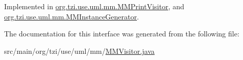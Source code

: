 Implemented in \hyperlink{classorg_1_1tzi_1_1use_1_1uml_1_1mm_1_1_m_m_print_visitor_a9b76c4e1037176dbedbced970a4332a2}{org.\-tzi.\-use.\-uml.\-mm.\-M\-M\-Print\-Visitor}, and \hyperlink{classorg_1_1tzi_1_1use_1_1uml_1_1mm_1_1_m_m_instance_generator_a4f4eb1eb6d803d5123d4d0cc0a38195d}{org.\-tzi.\-use.\-uml.\-mm.\-M\-M\-Instance\-Generator}.



The documentation for this interface was generated from the following file\-:\begin{DoxyCompactItemize}
\item 
src/main/org/tzi/use/uml/mm/\hyperlink{_m_m_visitor_8java}{M\-M\-Visitor.\-java}\end{DoxyCompactItemize}
